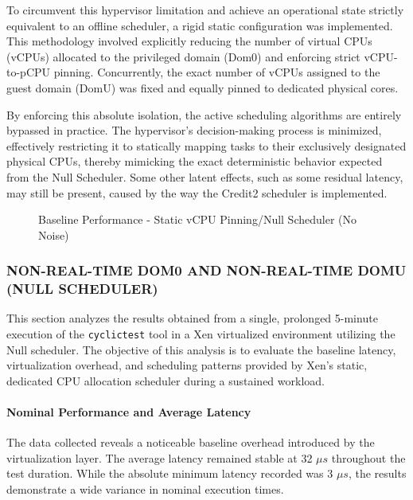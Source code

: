 To circumvent this hypervisor limitation and achieve an operational
state strictly equivalent to an offline scheduler, a rigid static
configuration was implemented. This methodology involved explicitly
reducing the number of virtual CPUs (vCPUs) allocated to the privileged
domain (Dom0) and enforcing strict vCPU-to-pCPU pinning. Concurrently,
the exact number of vCPUs assigned to the guest domain (DomU) was fixed
and equally pinned to dedicated physical cores.

By enforcing this absolute isolation, the active scheduling algorithms
are entirely bypassed in practice. The hypervisor's decision-making
process is minimized, effectively restricting it to statically mapping
tasks to their exclusively designated physical CPUs, thereby mimicking
the exact deterministic behavior expected from the Null Scheduler. Some
other latent effects, such as some residual latency, may still be
present, caused by the way the Credit2 scheduler is implemented.

\begin{figure}
\centering

\caption{Baseline Performance - Static vCPU Pinning/Null Scheduler (No
Noise)}
\end{figure}

\subsubsection{NON-REAL-TIME DOM0 AND NON-REAL-TIME DOMU (NULL
SCHEDULER)}\label{non-real-time-dom0-and-non-real-time-domu-null-scheduler}

This section analyzes the results obtained from a single, prolonged
5-minute execution of the \texttt{cyclictest} tool in a Xen virtualized
environment utilizing the Null scheduler. The objective of this analysis
is to evaluate the baseline latency, virtualization overhead, and
scheduling patterns provided by Xen's static, dedicated CPU allocation
scheduler during a sustained workload.

\paragraph{Nominal Performance and Average
Latency}\label{nominal-performance-and-average-latency-15}

The data collected reveals a noticeable baseline overhead introduced by
the virtualization layer. The average latency remained stable at 32 $\mu s$
throughout the test duration. While the absolute minimum latency
recorded was 3 $\mu s$, the results demonstrate a wide variance in nominal
execution times.

